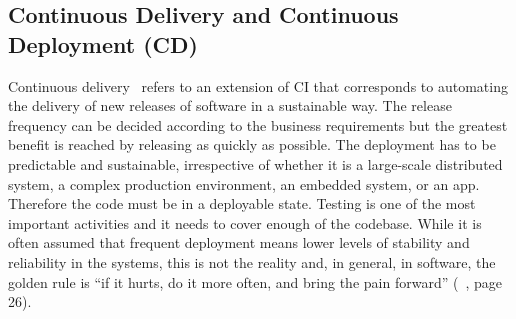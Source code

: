 \documentclass[a4paper,
               keeplastbox,   %
               ]{jacow}
\begin{document}
\subsection{Continuous Delivery and Continuous Deployment (CD)}
Continuous delivery~\cite{CD} refers to an extension of CI that corresponds to automating the delivery of new releases of software in a sustainable way. The release frequency can be decided according to the business requirements but the greatest benefit is reached by releasing as quickly as possible.
The deployment has to be predictable and sustainable, irrespective of whether it is a large-scale distributed system, a complex production environment, an embedded system, or an app. Therefore the code must be in a deployable state. Testing is one of the most important activities and it needs to cover enough of the codebase.
While it is often assumed that frequent deployment means lower levels of stability and reliability in the systems, this is not the reality and, in general, in software, the golden rule is “if it hurts, do it more often, and bring the pain forward” (~\cite{CD}, page 26).
\end{document}
